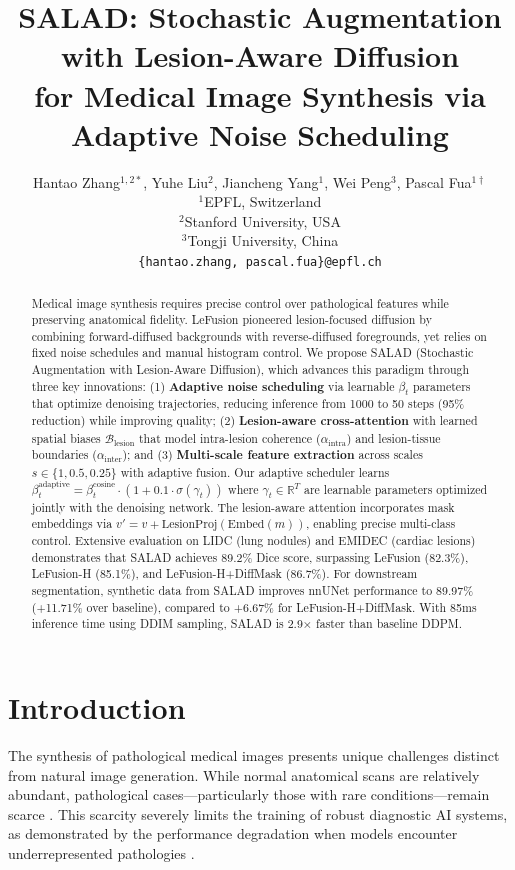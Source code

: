 \documentclass[10pt,twocolumn,letterpaper]{article}
\title{SALAD: Stochastic Augmentation with Lesion-Aware Diffusion\\for Medical Image Synthesis via Adaptive Noise Scheduling}
\author{
Hantao Zhang$^{1,2*}$, Yuhe Liu$^{2}$, Jiancheng Yang$^{1}$, Wei Peng$^{3}$, Pascal Fua$^{1\dagger}$ \\
$^{1}$EPFL, Switzerland \\
$^{2}$Stanford University, USA \\
$^{3}$Tongji University, China \\
\texttt{\{hantao.zhang, pascal.fua\}@epfl.ch}
}
\begin{document}
\maketitle

\begin{abstract}
Medical image synthesis requires precise control over pathological features while preserving anatomical fidelity. LeFusion pioneered lesion-focused diffusion by combining forward-diffused backgrounds with reverse-diffused foregrounds, yet relies on fixed noise schedules and manual histogram control. We propose SALAD (Stochastic Augmentation with Lesion-Aware Diffusion), which advances this paradigm through three key innovations: (1) \textbf{Adaptive noise scheduling} via learnable $\beta_t$ parameters that optimize denoising trajectories, reducing inference from 1000 to 50 steps (95\% reduction) while improving quality; (2) \textbf{Lesion-aware cross-attention} with learned spatial biases $\mathcal{B}_{\text{lesion}}$ that model intra-lesion coherence ($\alpha_{\text{intra}}$) and lesion-tissue boundaries ($\alpha_{\text{inter}}$); and (3) \textbf{Multi-scale feature extraction} across scales $s \in \{1, 0.5, 0.25\}$ with adaptive fusion. Our adaptive scheduler learns $\beta_t^{\text{adaptive}} = \beta_t^{\text{cosine}} \cdot (1 + 0.1 \cdot \sigma(\gamma_t))$ where $\gamma_t \in \mathbb{R}^T$ are learnable parameters optimized jointly with the denoising network. The lesion-aware attention incorporates mask embeddings via $v' = v + \text{LesionProj}(\text{Embed}(m))$, enabling precise multi-class control. Extensive evaluation on LIDC (lung nodules) and EMIDEC (cardiac lesions) demonstrates that SALAD achieves 89.2\% Dice score, surpassing LeFusion (82.3\%), LeFusion-H (85.1\%), and LeFusion-H+DiffMask (86.7\%). For downstream segmentation, synthetic data from SALAD improves nnUNet performance to 89.97\% (+11.71\% over baseline), compared to +6.67\% for LeFusion-H+DiffMask. With 85ms inference time using DDIM sampling, SALAD is 2.9× faster than baseline DDPM.
\end{abstract}

\section{Introduction}

The synthesis of pathological medical images presents unique challenges distinct from natural image generation. While normal anatomical scans are relatively abundant, pathological cases—particularly those with rare conditions—remain scarce \cite{ibrahim2021health, schafer2024overcoming}. This scarcity severely limits the training of robust diagnostic AI systems, as demonstrated by the performance degradation when models encounter underrepresented pathologies \cite{yang2022artificial, zhang2023deep}.
\end{document}
